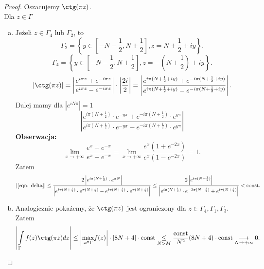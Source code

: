 \documentclass[../main.tex]{subfiles}
\begin{document}
    \begin{proof}
        Oszacujemy $\ctg(\pi z)$.\\
        Dla  $z\in \Gamma$
        \begin{enumerate}[a)]
            \item Jeżeli $z\in \Gamma_4$ lub $\Gamma_2$, to
                \[
                    \Gamma_2 = \left\{ y\in \left[ -N - \frac{1}{2}, N + \frac{1}{2} \right] , z = N + \frac{1}{2} + iy \right\}
                .\]
                \[
                    \Gamma_4 = \left\{ y\in \left[ -N - \frac{1}{2}, N + \frac{1}{2} \right] , z = -(N + \frac{1}{2}) + iy \right\}
                .\]
            \[
                \left| \ctg(\pi z) \right| = \left| \frac{e^{i\pi z} + e^{-i \pi z}}{e^{i \pi z} - e^{- i \pi z}} \right|\cdot \left| \frac{2i}{2} \right| = \left| \frac{e^{i\pi(N + \frac{1}{2} + iy)} + e^{-i\pi(N + \frac{1}{2} + iy)}}{e^{i\pi(N + \frac{1}{2} + iy)} - e^{-i\pi(N + \frac{1}{2} + iy)}} \right|
            .\]
        Dalej mamy dla $\left| e^{iN\pi} \right| = 1$
        \begin{equation}
            \label{eqn: delta}
            \left| \frac{e^{i\pi(N + \frac{1}{2})}\cdot e^{-y\pi} + e^{-i\pi(N + \frac{1}{2})}\cdot e^{y\pi}}{e^{i\pi(N + \frac{1}{2})}\cdot e^{-y\pi} - e^{-i\pi(N + \frac{1}{2})}\cdot e^{y\pi}} \right| \tag{$\Delta$}
        \end{equation}
    \textbf{Obserwacja: }
                \[
                    \lim\limits_{x\to +\infty} \frac{e^{x} + e^{-x}}{e^{x} - e^{-x}} = \lim\limits_{x\to + \infty} \frac{e^x(1+e^{-2x})}{e^{x}(1-e^{-2x})} = 1
                .\]
            Zatem
            \[
                \left|\eqref{eqn: delta}\right| \le \frac{2\left| e^{i\pi(N + \frac{1}{2})}\cdot e^{\pi N} \right|}{\left| e^{i\pi(N + \frac{1}{2})} \cdot e^{\pi(N+\frac{1}{2})} - e^{i \pi(N + \frac{1}{2})}\cdot e^{\pi(N + \frac{1}{2})} \right| } \le \frac{2 \left| e^{i\pi(N + \frac{1}{2})} \right|}{\left| e^{i \pi(N + \frac{1}{2})} \cdot e^{-2\pi(N + \frac{1}{2})} + e^{i\pi(N + \frac{1}{2})} \right| } < \text{const}
            .\]
    \item Analogicznie pokażemy, że $\ctg(\pi z)$ jest ograniczony dla $z\in \Gamma_4, \Gamma_1, \Gamma_3$. Zatem
        \[
            \left| \int\limits_{\Gamma}f(z)\ctg(\pi z)dz \right| \le \left| \underset{z\in\Gamma}{\max}f(z)  \right| \cdot \left| 8N + 4 \right| \cdot \text{const} \underset{N > M}{\le} \frac{\text{const}}{N^2} (8N + 4) \cdot \text{const} \underset{N \to + \infty}{\longrightarrow}  0
        .\]
        \end{enumerate}
    \end{proof}
\end{document}
